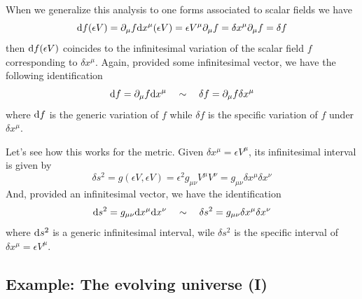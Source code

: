 \documentclass[../main/main.tex]{subfiles}
\begin{document}
When we generalize this analysis to one forms associated to scalar fields we have
\[\de f(\epsilon V)=\partial_\mu f\de x^\mu(\epsilon V)=\epsilon V^\mu\partial_\mu f=\delta x^\mu\partial_\mu f=\delta f\]
then $\de f(\epsilon V)$ coincides to the infinitesimal variation of the scalar field $f$ corresponding to $\delta x^\mu$. Again, provided some infinitesimal vector, we have the following identification
\[\textup{d} f=\partial_\mu f\textup{d} x^\mu\quad\sim\quad\delta f=\partial_\mu f\delta x^\mu\]
where $\textup{d} f$ is the generic variation of $f$ while $\delta f$ is the specific variation of $f$ under $\delta x^\mu$.
 
 Let's see how this works for the metric. Given $\delta x^\mu=\epsilon V^\mu$, its infinitesimal interval is given by 
\[\delta s^2=g(\epsilon V,\epsilon V)=\epsilon ^2g_{\mu\nu}V^\mu V^\nu=g_{\mu\nu}\delta x^\mu\delta x^\nu\]
And, provided an infinitesimal vector, we have the identification
\[\textup{d} s^2=g_{\mu\nu}\textup{d} x^\mu\textup{d} x^\nu\quad\sim\quad\delta s^2=g_{\mu\nu}\delta x^\mu\delta x^\nu\]
where $\textup{d} s^2$ is a generic infinitesimal interval, wile $\delta s^2$ is the specific interval of $\delta x^\mu=\epsilon V^\mu$.\\

\subsection{Example: The evolving universe (I)}
\end{document}
